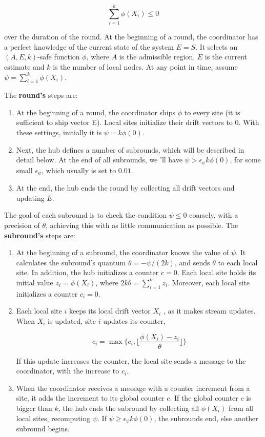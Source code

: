 \begin{equation}
    \sum_{i=1}^{k} \phi(X_i) \leq 0\label{eq:equation34}
\end{equation}

over the duration of the round.
At the beginning of a round, the coordinator has a perfect knowledge of the current state of the system $E = S$.
It selects an $(A, E, k)$-safe function $\phi$, where $A$ is the admissible region, $E$ is the current estimate and $k$ is the number of local nodes.
At any point in time, assume $\psi = \sum_{i=1}^{k} \phi(X_i)$.

The \textbf{round's} steps are:

\begin{enumerate}
    \item At the beginning of a round, the coordinator ships $\phi$ to every site (it is sufficient to ship vector E).
    Local sites initialize their drift vectors to 0.
    With these settings, initially it is $\psi = k \phi(0)$.
    \item Next, the hub defines a number of subrounds, which will be described in detail below.
    At the end of all subrounds, we 'll have $\psi > \epsilon_\psi k \phi(0)$, for some small $\epsilon_\psi$, which usually is set to $0.01$.
    \item At the end, the hub ends the round by collecting all drift vectors and updating $E$.
\end{enumerate}

The goal of each subround is to check the condition $\psi \leq 0$ coarsely, with a precision of $\theta$, achieving this with as little communication as possible.
The \textbf{subround's} steps are:

\begin{enumerate}
    \item At the beginning of a subround, the coordinator knows the value of $\psi$.
    It calculates the subround’s quantum $\theta = -\psi /(2k)$, and sends $\theta$ to each local site.
    In addition, the hub initializes a counter $c = 0$.
    Each local site holds its initial value $z_i = \phi(X_i)$, where $2k\theta = \sum_{i=1}^{k} z_i$.
    Moreover, each local site initializes a counter $c_i = 0$.
    \item Each local site $i$ keeps its local drift vector $X_i$ , as it makes stream updates.
    When $X_i$ is updated, site $i$ updates its counter,
    
    \begin{equation}
        c_i = \max\{c_i, \lfloor\frac{\phi(X_i) - z_i}{\theta}\rfloor\} \label{eq:equation34b}
    \end{equation}

    If this update increases the counter, the local site sends a message to the coordinator, with the increase to $c_i$.
    \item When the coordinator receives a message with a counter increment from a site, it adds the increment to its global counter $c$.
    If the global counter $c$ is bigger than $k$, the hub ends the subround by collecting all $\phi(X_i)$ from all local sites, recomputing $\psi$.
    If $\psi \geq \epsilon_\psi k \phi(0)$, the subrounds end, else another subround begins.
\end{enumerate}
